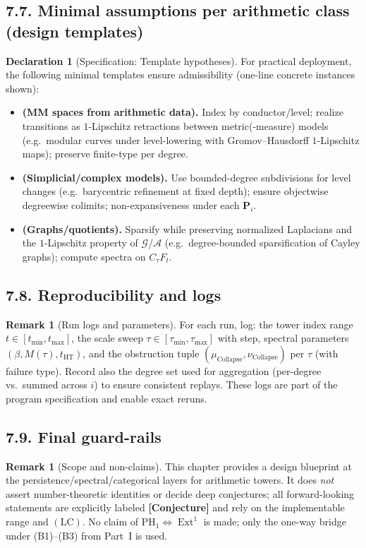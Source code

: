 \documentclass[11pt]{article}
\numberwithin{equation}{section}
\theoremstyle{plain}
\theoremstyle{definition}
\theoremstyle{remark}
\DeclareMathOperator{\Ext}{Ext}
\DeclareRobustCommand{\hyp}{\nobreakdash-}
\theoremstyle{plain}
\theoremstyle{definition}
\numberwithin{equation}{section}
\theoremstyle{definition}
\newtheorem{remark}[theorem]{Remark}
\newtheorem{declaration}[theorem]{Declaration}
\DeclareRobustCommand{\muc}{\mu_{\mathrm{Collapse}}}
\DeclareRobustCommand{\nuc}{\nu_{\mathrm{Collapse}}}
\DeclareRobustCommand{\LC}{\texorpdfstring{\ensuremath{\mathrm{(LC)}}}{(LC)}}
\numberwithin{equation}{section}
\theoremstyle{plain}
\theoremstyle{definition}
\theoremstyle{remark}
\providecommand{\muc}{\mu_{\mathrm{Collapse}}}
\providecommand{\nuc}{\nu_{\mathrm{Collapse}}}
\begin{document}
\subsection*{7.7. Minimal assumptions per arithmetic class (design templates)}
\begin{declaration}[Specification: Template hypotheses]\label{spec:templates}
For practical deployment, the following minimal templates ensure admissibility (one\hyp line concrete instances shown):
\begin{itemize}
  \item \textbf{(MM spaces from arithmetic data).} Index by conductor/level; realize transitions as \(1\)\hyp Lipschitz retractions between metric(\hyp measure) models (e.g.\ modular curves under level\hyp lowering with Gromov–Hausdorff \(1\)\hyp Lipschitz maps); preserve finite\hyp type per degree.
  \item \textbf{(Simplicial/complex models).} Use bounded\hyp degree subdivisions for level changes (e.g.\ barycentric refinement at fixed depth); ensure objectwise degreewise colimits; non\hyp expansiveness under each \(\mathbf{P}_i\).
  \item \textbf{(Graphs/quotients).} Sparsify while preserving normalized Laplacians and the \(1\)\hyp Lipschitz property of \(\mathcal{G}\)/\(\mathcal{A}\) (e.g.\ degree\hyp bounded sparsification of Cayley graphs); compute spectra on \(C_\tau F_t\).
\end{itemize}
\end{declaration}

\subsection*{7.8. Reproducibility and logs}
\begin{remark}[Run logs and parameters]\label{rk:logs}
For each run, log: the tower index range \(t\in[t_{\min},t_{\max}]\), the scale sweep \(\tau\in[\tau_{\min},\tau_{\max}]\) with step, spectral parameters \((\beta,M(\tau),t_{\mathrm{HT}})\), and the obstruction tuple \((\muc,\nuc)\) per \(\tau\) (with failure type).
Record also the degree set used for aggregation (per\hyp degree vs.\ summed across \(i\)) to ensure consistent replays.
These logs are part of the program specification and enable exact reruns.
\end{remark}

\subsection*{7.9. Final guard-rails}
\begin{remark}[Scope and non-claims]\label{rk:nonclaims}
This chapter provides a design blueprint at the persistence/spectral/categorical layers for arithmetic towers.
It does \emph{not} assert number\hyp theoretic identities or decide deep conjectures; all forward\hyp looking statements are explicitly labeled \textbf{[Conjecture]} and rely on the implementable range and \LC.
No claim of \(\mathrm{PH}_1\Leftrightarrow\Ext^1\) is made; only the one\hyp way bridge under \textup{(B1)–(B3)} from Part~I is used.
\end{remark}
\end{document}
